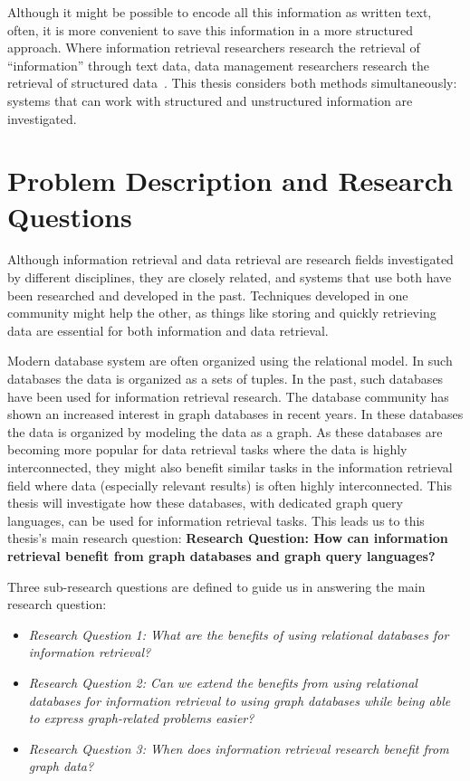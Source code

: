 Although it might be possible to encode all this information as written text, often, it is more convenient to save this information in a more structured approach. Where information retrieval researchers research the retrieval of ``information'' through text data, data management researchers research the retrieval of structured data~\citep{rijsbergen79information}. This thesis considers both methods simultaneously: systems that can work with structured and unstructured information are investigated.

\section{Problem Description and Research Questions}
Although information retrieval and data retrieval are research fields investigated by different disciplines, they are closely related, and systems that use both have been researched and developed in the past. Techniques developed in one community might help the other, as things like storing and quickly retrieving data are essential for both information and data retrieval. 

Modern database system are often organized using the relational model. In such databases the data is organized as a sets of tuples. In the past, such databases have been used for information retrieval research. The database community has shown an increased interest in graph databases in recent years. In these databases the data is organized by modeling the data as a graph. As these databases are becoming more popular for data retrieval tasks where the data is highly interconnected, they might also benefit similar tasks in the information retrieval field where data (especially relevant results) is often highly interconnected. This thesis will investigate how these databases, with dedicated graph query languages, can be used for information retrieval tasks. This leads us to this thesis's main research question: \textbf{Research Question: How can information retrieval benefit from graph databases and graph query languages?}

Three sub-research questions are defined to guide us in answering the main research question:

\begin{itemize}
	\item \emph{Research Question 1: What are the benefits of using relational databases for information retrieval?} 
	\item \emph{Research Question 2: Can we extend the benefits from using relational databases for information retrieval to using graph databases while being able to express graph-related problems easier?}  
	\item \emph{Research Question 3: When does information retrieval research benefit from graph data?} 
\end{itemize}

